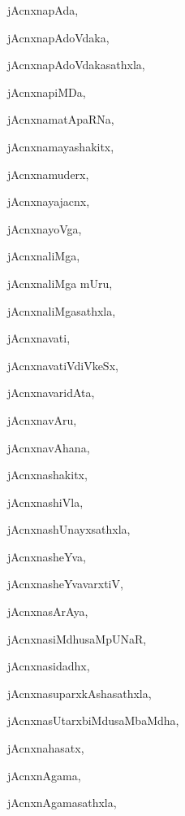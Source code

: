 \begin{multicols}{2}
{jAcnxnapAda}, \pageref{jAcnxnapAda}

{jAcnxnapAdoVdaka}, \pageref{jAcnxnapAdoVdaka}

{jAcnxnapAdoVdakasathxla}, \pageref{jAcnxnapAdoVdakasathxla}

{jAcnxnapiMDa}, \pageref{jAcnxnapiMDa}

{jAcnxnamatApaRNa}, \pageref{jAcnxnamatApaRNa}

{jAcnxnamayashakitx}, \pageref{jAcnxnamayashakitx}

{jAcnxnamuderx}, \pageref{jAcnxnamuderx}

{jAcnxnayajacnx}, \pageref{jAcnxnayajacnx}

{jAcnxnayoVga}, \pageref{jAcnxnayoVga}

{jAcnxnaliMga}, \pageref{jAcnxnaliMga}

{jAcnxnaliMga mUru}, \pageref{jAcnxnaliMga mUru}

{jAcnxnaliMgasathxla}, \pageref{jAcnxnaliMgasathxla}

{jAcnxnavati}, \pageref{jAcnxnavati}

{jAcnxnavatiVdiVkeSx}, \pageref{jAcnxnavatiVdiVkeSx}

{jAcnxnavaridAta}, \pageref{jAcnxnavaridAta}

{jAcnxnavAru}, \pageref{jAcnxnavAru}

{jAcnxnavAhana}, \pageref{jAcnxnavAhana}

{jAcnxnashakitx}, \pageref{jAcnxnashakitx}

{jAcnxnashiVla}, \pageref{jAcnxnashiVla}

{jAcnxnashUnayxsathxla}, \pageref{jAcnxnashUnayxsathxla}

{jAcnxnasheYva}, \pageref{jAcnxnasheYva}

{jAcnxnasheYvavarxtiV}, \pageref{jAcnxnasheYvavarxtiV}

{jAcnxnasArAya}, \pageref{jAcnxnasArAya}

{jAcnxnasiMdhusaMpUNaR}, \pageref{jAcnxnasiMdhusaMpUNaR}

{jAcnxnasidadhx}, \pageref{jAcnxnasidadhx}

{jAcnxnasuparxkAshasathxla}, \pageref{jAcnxnasuparxkAshasathxla}

{jAcnxnasUtarxbiMdusaMbaMdha}, \pageref{jAcnxnasUtarxbiMdusaMbaMdha}

{jAcnxnahasatx}, \pageref{jAcnxnahasatx}

{jAcnxnAgama}, \pageref{jAcnxnAgama}

{jAcnxnAgamasathxla}, \pageref{jAcnxnAgamasathxla}


\end{multicols}
